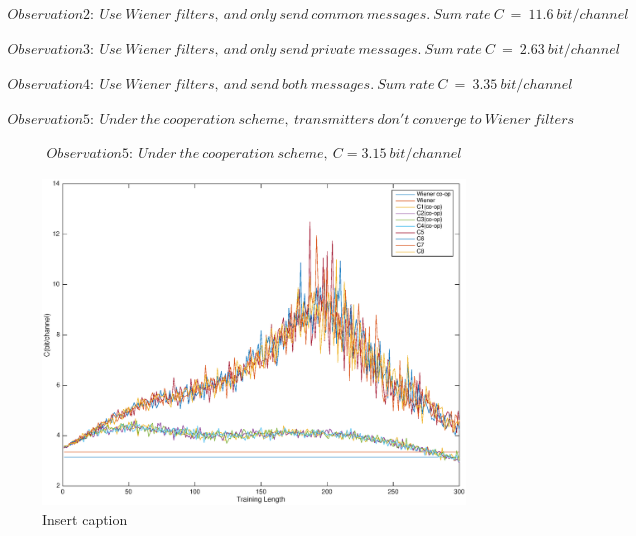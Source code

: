 \documentclass[11pt, oneside]{article}   	%
\begin{document}
\begin{align*}
Observation2:\ Use\ Wiener\ filters,\ and\ only\ send\ common\ messages.\ Sum\ rate\ C\ =\ 11.6\ bit/channel
\end{align*}

\begin{align*}
Observation3:\ Use\ Wiener\ filters,\ and\ only\ send\ private\ messages.\ Sum\ rate\ C\ =\ 2.63\ bit/channel
\end{align*}

\begin{align*}
Observation4:\ Use\ Wiener\ filters,\ and\  send\ both\ messages.\ Sum\ rate\ C\ =\ 3.35\ bit/channel
\end{align*}

\begin{align*}
Observation5:\ Under\ the\ cooperation\ scheme,\ transmitters\ don't\ converge\ to\ Wiener\ filters 
\end{align*}

\begin{align*}
Observation5:\ Under\ the\ cooperation\ scheme,\ C=3.15\ bit/channel
\end{align*}



\begin{figure}[bp!]
    \centering
    \includegraphics[width=150mm]{01}
    \caption{Insert caption}
\end{figure} 



 
\end{document}
